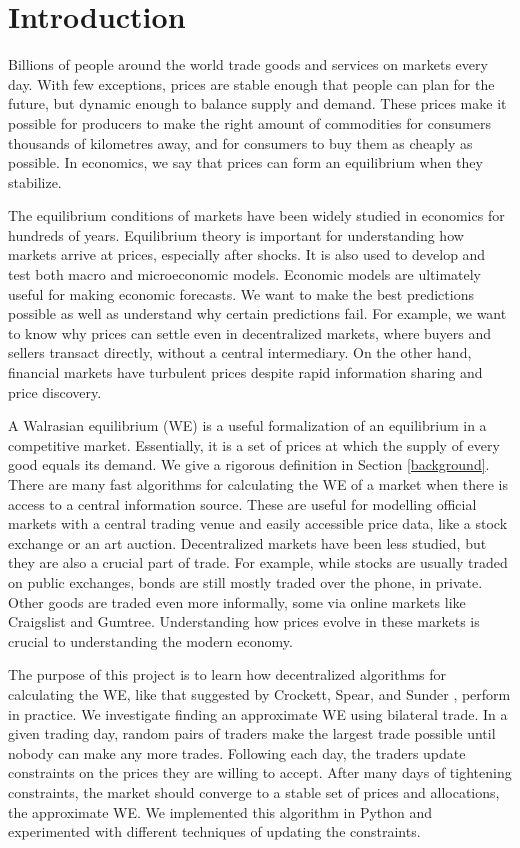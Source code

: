\documentclass[12pt,a4paper,titlepage]{article}
\begin{document}
\tableofcontents
\newpage

\section{Introduction}
Billions of people around the world trade goods and services on markets every day.
With few exceptions, prices are stable enough that people can plan for the future, but dynamic enough to balance supply and demand.
These prices make it possible for producers to make the right amount of commodities for consumers thousands of kilometres away, and for consumers to buy them as cheaply as possible.
In economics, we say that prices can form an equilibrium when they stabilize.

The equilibrium conditions of markets have been widely studied in economics for hundreds of years.
Equilibrium theory is important for understanding how markets arrive at prices, especially after shocks. 
It is also used to develop and test both macro and microeconomic models. 
Economic models are ultimately useful for making economic forecasts.
We want to make the best predictions possible as well as understand why certain predictions fail.
For example, we want to know why prices can settle even in decentralized markets, where buyers and sellers transact directly, without a central intermediary.
On the other hand, financial markets have turbulent prices despite rapid information sharing and price discovery.

A Walrasian equilibrium (WE) is a useful formalization of an equilibrium in a competitive market.
Essentially, it is a set of prices at which the supply of every good equals its demand.
We give a rigorous definition in Section \ref{background}.
There are many fast algorithms for calculating the WE of a market when there is access to a central information source.
These are useful for modelling official markets with a central trading venue and easily accessible price data, like a stock exchange or an art auction.
Decentralized markets have been less studied, but they are also a crucial part of trade.
For example, while stocks are usually traded on public exchanges, bonds are still mostly traded over the phone, in private.
Other goods are traded even more informally, some via online markets like Craigslist and Gumtree.
Understanding how prices evolve in these markets is crucial to understanding the modern economy.

The purpose of this project is to learn how decentralized algorithms for calculating the WE, like that suggested by Crockett, Spear, and Sunder \cite{crockett}, perform in practice.
We investigate finding an approximate WE using bilateral trade.
In a given trading day, random pairs of traders make the largest trade possible until nobody can make any more trades. 
Following each day, the traders update constraints on the prices they are willing to accept.
After many days of tightening constraints, the market should converge to a stable set of prices and allocations, the approximate WE.
We implemented this algorithm in Python and experimented with different techniques of updating the constraints.
\end{document}
